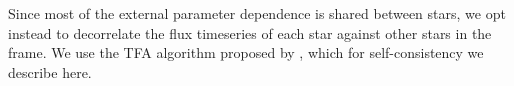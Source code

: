 \documentclass[12pt,twocolumn,tighten]{aastex62}
\begin{document}
% 
% 
% 
% 
% 
% 
	

Since most of the external parameter dependence is shared between
stars, we opt instead to decorrelate the flux timeseries of each star
against other stars in the frame.  We use the TFA algorithm proposed
by \citet{kovacs_trend_2005}, which for self-consistency we describe
here.
\end{document}
